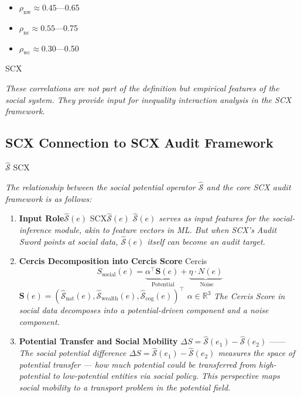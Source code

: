 \documentclass[11pt,a4paper]{article}
\theoremstyle{definition}
\newcommand{\Sop}{\hat{\mathcal{S}}}
\newcommand{\Sopnat}{\hat{\mathcal{S}}_{\text{nat}}}
\newcommand{\Sopwealth}{\hat{\mathcal{S}}_{\text{wealth}}}
\newcommand{\Sopcog}{\hat{\mathcal{S}}_{\text{cog}}}
\newcommand{\R}{\mathbb{R}}
\begin{document}
\begin{itemize}[leftmargin=*]
    \item $\rho_{\text{nw}} \approx 0.45$—0.65
    \item $\rho_{\text{nc}} \approx 0.55$—0.75
    \item $\rho_{\text{wc}} \approx 0.30$—0.50
\end{itemize}

\noindent \textit{}
SCX

\medskip
\noindent\textit{These correlations are \textit{not} part of the definition but empirical features of the social system. They provide input for inequality interaction analysis in the SCX framework.}

\subsection{SCX Connection to SCX Audit Framework}

 $\Sop$ SCX

\medskip
\noindent\textit{The relationship between the social potential operator $\Sop$ and the core SCX audit framework is as follows:}

\begin{enumerate}[leftmargin=*,label=\textbf{(\arabic*)}]
    \item \textbf{ Input Role}$\Sop(e)$ \textit{}
    SCX$\Sop(e)$ 
    \textit{$\Sop(e)$ serves as input features for the social-inference module, akin to feature vectors in ML. But when SCX's Audit Sword points at social data, $\Sop(e)$ itself can become an audit target.}
    
    \item \textbf{Cercis Decomposition into Cercis Score}
    Cercis
    \begin{equation}
        S_{\text{social}}(e) = \underbrace{\alpha^\top \mathbf{S}(e)}_{\text{ Potential}} + \underbrace{\eta \cdot N(e)}_{\text{ Noise}}
    \end{equation}
     $\mathbf{S}(e) = (\Sopnat(e), \Sopwealth(e), \Sopcog(e))^\top$
    $\alpha \in \R^3$ 
    \textit{The Cercis Score in social data decomposes into a potential-driven component and a noise component.}
    
    \item \textbf{ Potential Transfer and Social Mobility}
     $\Delta S = \Sop(e_1) - \Sop(e_2)$ 
    \textit{}——
    \textit{}
    \textit{The social potential difference $\Delta S = \Sop(e_1) - \Sop(e_2)$ measures the space of potential \textit{transfer} — how much potential could be transferred from high-potential to low-potential entities via social policy. This perspective maps social mobility to a \textit{transport problem} in the potential field.}
\end{enumerate}
\end{document}

